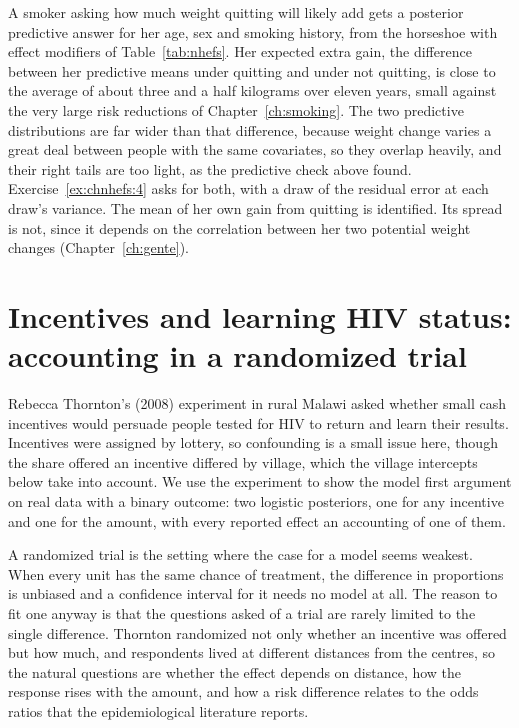 A smoker asking how much weight quitting will likely add gets a posterior predictive answer for her age, sex and smoking history, from the horseshoe with effect modifiers of Table~\ref{tab:nhefs}. Her expected extra gain, the difference between her predictive means under quitting and under not quitting, is close to the average of about three and a half kilograms over eleven years, small against the very large risk reductions of Chapter~\ref{ch:smoking}. The two predictive distributions are far wider than that difference, because weight change varies a great deal between people with the same covariates, so they overlap heavily, and their right tails are too light, as the predictive check above found. Exercise~\ref{ex:chnhefs:4} asks for both, with a draw of the residual error at each draw's variance. The mean of her own gain from quitting is identified. Its spread is not, since it depends on the correlation between her two potential weight changes (Chapter~\ref{ch:gente}).

\section[Incentives and learning HIV status]{Incentives and learning HIV status: accounting in a randomized trial}\label{sec:thornton}

Rebecca Thornton's (2008) experiment in rural Malawi asked whether small cash incentives would persuade people tested for HIV to return and learn their results. Incentives were assigned by lottery, so confounding is a small issue here, though the share offered an incentive differed by village, which the village intercepts below take into account. We use the experiment to show the model first argument on real data with a binary outcome: two logistic posteriors, one for any incentive and one for the amount, with every reported effect an accounting of one of them.

A randomized trial is the setting where the case for a model seems weakest. When every unit has the same chance of treatment, the difference in proportions is unbiased and a confidence interval for it needs no model at all. The reason to fit one anyway is that the questions asked of a trial are rarely limited to the single difference. Thornton randomized not only whether an incentive was offered but how much, and respondents lived at different distances from the centres, so the natural questions are whether the effect depends on distance, how the response rises with the amount, and how a risk difference relates to the odds ratios that the epidemiological literature reports.

